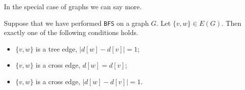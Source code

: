 %
%

In the special case of graphs we can say more.

\begin{Theorem} \label{thm:BFS-grapharcclass}
Suppose that we have performed \texttt{BFS} on a graph $G$. 
Let $\{v, w\}\in E(G)$. Then exactly one of the following conditions holds.
\begin{itemize}
	\item $\{v, w\}$ is a tree edge, $| d[w] - d[v] |= 1$;
	\item $\{v, w\}$ is a cross edge, $d[w] = d[v]$;
	\item $\{v, w\}$ is a cross edge, $| d[w] - d[v] | = 1$.
\end{itemize}
\end{Theorem}


